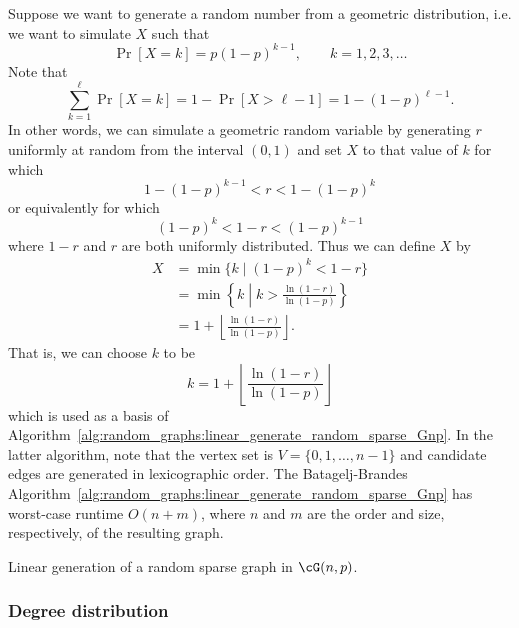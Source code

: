 Suppose we want to generate a random
number from a
geometric distribution, i.e. we want to
simulate $X$ such that
\[
\Pr[X = k]
=
p (1 - p)^{k-1},
\qquad
k = 1, 2, 3, \dots
\]
Note that
\[
\sum_{k=1}^{\ell} \Pr[X=k]
=
1 - \Pr[X > \ell - 1]
=
1 - (1 - p)^{\ell - 1}.
\]
In other words, we can simulate a
geometric random variable by
generating $r$ uniformly at random from the interval $(0,1)$ and set
$X$ to that value of $k$ for which
\[
1 - (1 - p)^{k-1} < r < 1 - (1 - p)^k
\]
or equivalently for which
\[
(1 - p)^k < 1 - r < (1 - p)^{k-1}
\]
where $1 - r$ and $r$ are both uniformly
distributed. Thus we can define $X$ by
\begin{align*}
X
&=
\min\{k \mid (1 - p)^k < 1 - r\} \\[4pt]
&=
\min\left\{
  k \;\left|\; k > \frac{\ln(1 - r)} {\ln(1 - p)} \right.
\right\} \\[4pt]
&=
1 + \left\lfloor \frac{\ln(1 - r)} {\ln(1 - p)} \right\rfloor.
\end{align*}
That is, we can choose $k$ to be
\[
k
=
1 + \left\lfloor \frac{\ln(1 - r)} {\ln(1 - p)} \right\rfloor
\]
which is used as a basis of
Algorithm~\ref{alg:random_graphs:linear_generate_random_sparse_Gnp}. In
the latter algorithm, note that the vertex set is
$V = \{0, 1, \dots, n-1\}$ and candidate edges are generated in
lexicographic order. The Batagelj-Brandes
Algorithm~\ref{alg:random_graphs:linear_generate_random_sparse_Gnp}
has worst-case runtime $O(n + m)$, where $n$ and $m$ are the order and
size, respectively, of the resulting graph.

\begin{algorithm}[!htbp]

\caption{Linear generation of a random sparse graph in $\cG(n,p)$.}
\label{alg:random_graphs:linear_generate_random_sparse_Gnp}
\end{algorithm}



\subsubsection{Degree distribution}

